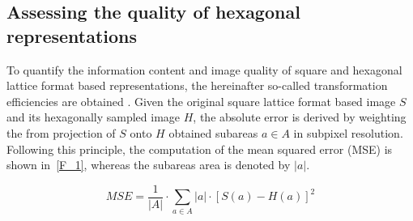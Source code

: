 \documentclass{article}
\begin{document}
\subsection{Assessing the quality of hexagonal representations}

To quantify the information content and image quality of square and hexagonal lattice format based representations, the hereinafter so-called transformation efficiencies are obtained \cite{Schlosser2019}. Given the original square lattice format based image $S$ and its hexagonally sampled image $H$, the absolute error is derived by weighting the from projection of $S$ onto $H$ obtained subareas $a \in A$ in subpixel resolution. Following this principle, the computation of the mean squared error (MSE) is shown in~\eqref{F_1}, whereas the subareas area is denoted by $|a|$.

\begin{equation}
	\mathit{MSE} = \frac{1}{|A|} \cdot \sum\limits_{a \in A} |a| \cdot [S(a) - H(a)]^2
%
	\label{F_1}
\end{equation}
\end{document}
